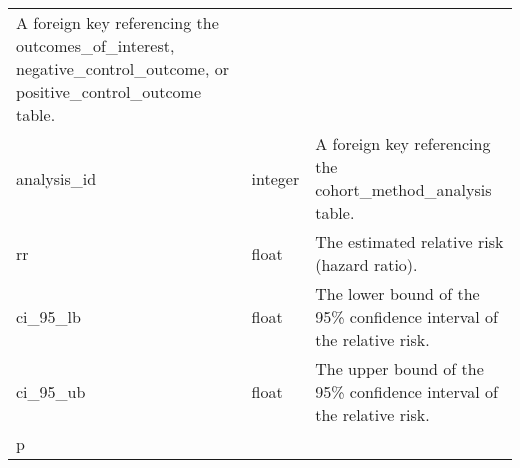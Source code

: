\documentclass[
]{article}
\begin{document}
\begin{longtable}[]{@{}lll@{}}
\begin{minipage}[t]{0.50\columnwidth}
A foreign key referencing the outcomes\_of\_interest,
negative\_control\_outcome, or positive\_control\_outcome table.\strut
\end{minipage}\tabularnewline
\begin{minipage}[t]{0.23\columnwidth}\raggedright
analysis\_id\strut
\end{minipage} & \begin{minipage}[t]{0.18\columnwidth}\raggedright
integer\strut
\end{minipage} & \begin{minipage}[t]{0.50\columnwidth}\raggedright
A foreign key referencing the cohort\_method\_analysis table.\strut
\end{minipage}\tabularnewline
\begin{minipage}[t]{0.23\columnwidth}\raggedright
rr\strut
\end{minipage} & \begin{minipage}[t]{0.18\columnwidth}\raggedright
float\strut
\end{minipage} & \begin{minipage}[t]{0.50\columnwidth}\raggedright
The estimated relative risk (hazard ratio).\strut
\end{minipage}\tabularnewline
\begin{minipage}[t]{0.23\columnwidth}\raggedright
ci\_95\_lb\strut
\end{minipage} & \begin{minipage}[t]{0.18\columnwidth}\raggedright
float\strut
\end{minipage} & \begin{minipage}[t]{0.50\columnwidth}\raggedright
The lower bound of the 95\% confidence interval of the relative
risk.\strut
\end{minipage}\tabularnewline
\begin{minipage}[t]{0.23\columnwidth}\raggedright
ci\_95\_ub\strut
\end{minipage} & \begin{minipage}[t]{0.18\columnwidth}\raggedright
float\strut
\end{minipage} & \begin{minipage}[t]{0.50\columnwidth}\raggedright
The upper bound of the 95\% confidence interval of the relative
risk.\strut
\end{minipage}\tabularnewline
\begin{minipage}[t]{0.23\columnwidth}\raggedright
p\strut
\end{minipage} & \begin{minipage}[t]{0.18\columnwidth}\raggedright

\end{minipage}
\end{longtable}
\end{document}
